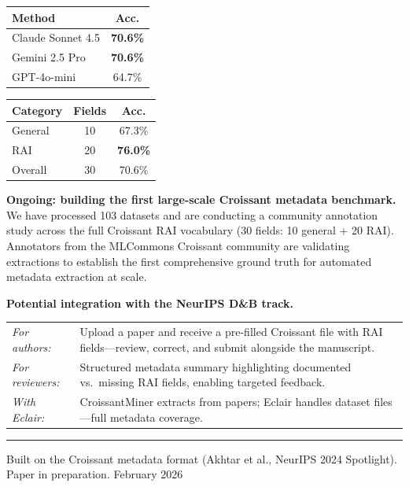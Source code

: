 \documentclass[11pt,a4paper]{article}
\begin{document}
\begin{minipage}[t]{0.46\textwidth}
\centering
{}
\small
\begin{tabular}{lc}
\toprule
\textbf{Method} & \textbf{Acc.} \\
\midrule
Claude Sonnet 4.5 & \textbf{70.6\%} \\
Gemini 2.5 Pro & \textbf{70.6\%} \\
GPT-4o-mini & 64.7\% \\
\bottomrule
\end{tabular}
\end{minipage}
\hfill
\begin{minipage}[t]{0.46\textwidth}
\centering
{}
\small
\begin{tabular}{lcc}
\toprule
\textbf{Category} & \textbf{Fields} & \textbf{Acc.} \\
\midrule
General & 10 & 67.3\% \\
RAI & 20 & \textbf{76.0\%} \\
\midrule
Overall & 30 & 70.6\% \\
\bottomrule
\end{tabular}
\end{minipage}

\vspace{0.4em}

\textbf{Ongoing: building the first large-scale Croissant metadata benchmark.}\quad
We have processed 103 datasets and are conducting a community annotation study across the full Croissant RAI vocabulary (30 fields: 10 general + 20 RAI). Annotators from the MLCommons Croissant community are validating extractions to establish the first comprehensive ground truth for automated metadata extraction at scale.

\vspace{0.15em}

\textbf{Potential integration with the NeurIPS D\&B track.}
\vspace{0.05em}

\begin{tabularx}{\textwidth}{@{}lX@{}}
\textit{For authors:} & Upload a paper and receive a pre-filled Croissant file with RAI fields---review, correct, and submit alongside the manuscript. \\[0.2em]
\textit{For reviewers:} & Structured metadata summary highlighting documented vs.\ missing RAI fields, enabling targeted feedback. \\[0.2em]
\textit{With Eclair:} & CroissantMiner extracts from papers; Eclair handles dataset files---full metadata coverage.
\end{tabularx}

\vspace{0.3em}
\noindent\rule{\textwidth}{0.4pt}
\vspace{0.1em}
{\small\color{graytext} Built on the Croissant metadata format (Akhtar et al., NeurIPS 2024 Spotlight). Paper in preparation. \hfill February 2026}
\end{document}
